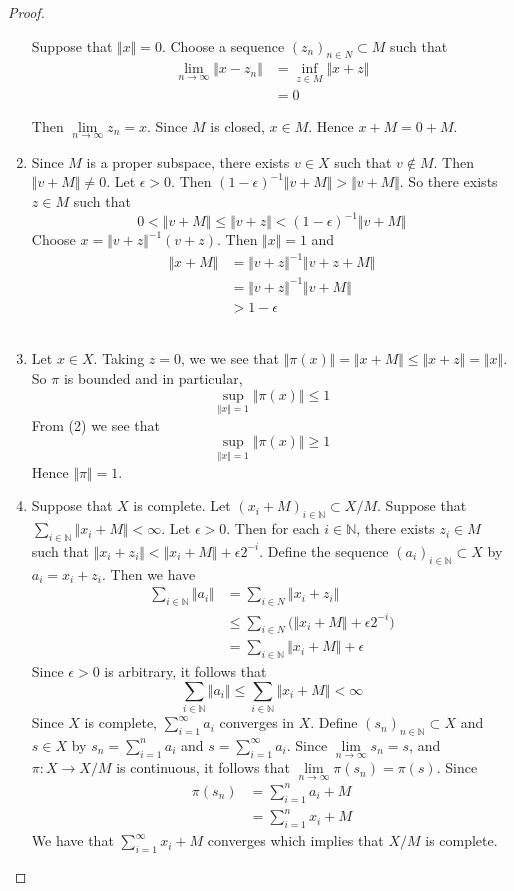 \documentclass[12pt]{amsart}
\newcommand{\ep}{\epsilon}
\newcommand{\N}{\mathbb{N}}
\newcommand{\limn}{\lim \limits_{n \rightarrow \infty}}
\newcommand{\n}{\Vert}
\begin{document}
\begin{proof}
\begin{enumerate}
Suppose that $\n x \n =0$. Choose a sequence $(z_n)_{n \in N} \subset M$ such that 
\begin{align*}
\lim\limits_{n \rightarrow \infty} \n x - z_n \n
& = \inf_{z \in M} \n x+ z \n\\
& = 0
\end{align*} 

Then $\limn z_n =x$. Since $M$ is closed, $x \in M$. Hence $x+M=0+M$. \vspace{1cm}\\
\item Since $M$ is a proper subspace, there exists $v \in X$ such that $v \not \in M$. Then $\n v +M \n \neq 0$. Let $\ep >0$. Then $(1-\ep)^{-1}\n v+M \n > \n v+M \n$. So there exists $z \in M$ such that $$0< \n v+M\n \leq \n v+z \n < (1-\ep)^{-1} \n v+M \n$$ Choose $x = \n v+z \n ^{-1}(v+z)$. Then $\n x \n =1$ and 
\begin{align*}
\n x+M \n
&= \n v+z \n ^{-1} \n v+z +M \n\\
&= \n v+z \n ^{-1} \n v +M \n\\
&> 1-\ep
\end{align*}\vspace{.5cm}\\
\item Let $x \in X$. Taking $z=0$, we we see that $\n \pi(x) \n =\n x+M \n \leq \n x+z \n = \n x \n$. So $\pi$ is bounded and in particular, $$\sup_{\n x \n =1} \n \pi(x) \n \leq 1$$ 
From (2) we see that $$\sup_{\n x \n =1} \n \pi(x) \n \geq 1$$
Hence $\n \pi\n = 1$. \vspace{.5cm}\\
\item Suppose that $X$ is complete. Let $(x_i+M)_{i\in \N} \subset X/M$. Suppose that $\sum\limits_{i\in \N} \n x_i+M \n < \infty$. Let $\ep>0$. Then for each $i \in \N$, there exists $z_i \in M$ such that $\n x_i +z_i \n < \n x_i +M \n + \ep2^{-i}$. Define the sequence $(a_i)_{i\in \N} \subset X$ by $a_i = x_i +z_i$. Then we have 
\begin{align*}
\sum_{i\in \N} \n a_i \n 
&= \sum_{i \in N} \n x_i + z_i \n \\
&\leq \sum_{i \in N} \bigg (\n x_i +M \n + \ep2^{-i} \bigg)\\
&= \sum_{i\in \N} \n x_i+M\n + \ep
\end{align*}
Since $\ep>0$ is arbitrary, it follows that $$\sum_{i\in \N} \n a_i \n \leq \sum_{i\in \N} \n x_i+M\n < \infty$$
Since $X$ is complete, $\sum\limits_{i=1}^{\infty}a_i$ converges in $X$. Define $(s_n)_{n \in \N} \subset X$ and $s \in X$ by $s_n = \sum\limits_{i =1}^n a_i$ and $s = \sum\limits_{i=1}^\infty a_i $. Since $\limn s_n = s$, and $\pi: X \rightarrow X/M$ is continuous, it follows that $\limn \pi(s_n) = \pi(s)$. Since 
\begin{align*}
\pi(s_n) 
&= \sum_{i=1}^n a_i +M\\
&= \sum_{i=1}^n x_i +M
\end{align*} 
We have that $\sum\limits_{i=1}^{\infty}x_i +M$ converges which implies that $X/M$ is complete.
\end{enumerate}
\end{proof}
\end{document}
